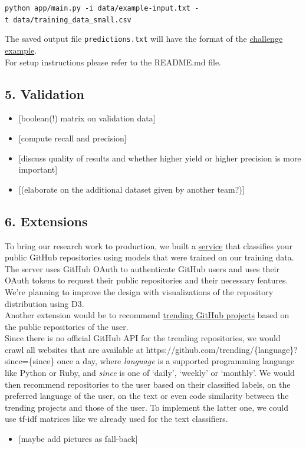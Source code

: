 \documentclass{article}
\providecommand{\tightlist}{%
  \setlength{\itemsep}{0pt}\setlength{\parskip}{0pt}}
\begin{document}
\texttt{python\ app/main.py\ -i\ data/example-input.txt\ -t\ data/training\_data\_small.csv}

The saved output file \texttt{predictions.txt} will have the format of
the
\href{https://github.com/InformatiCup/InformatiCup2017/blob/master/example-output}{challenge
example}.\\
For setup instructions please refer to the README.md file.

\subsection{5. Validation}\label{validation}

\begin{itemize}
\tightlist
\item
  {[}boolean(!) matrix on validation data{]}
\item
  {[}compute recall and precision{]}
\item
  {[}discuss quality of results and whether higher yield or higher
  precision is more important{]}
\item
  {[}(elaborate on the additional dataset given by another team?){]}
\end{itemize}

\subsection{6. Extensions}\label{extensions}

To bring our research work to production, we built a
\href{https://git-better.herokuapp.com/}{service} that classifies your
public GitHub repositories using models that were trained on our
training data. The server uses GitHub OAuth to authenticate GitHub users
and uses their OAuth tokens to request their public repositories and
their necessary features. We're planning to improve the design with
visualizations of the repository distribution using D3.\\
Another extension would be to recommend
\href{https://github.com/trending}{trending GitHub projects} based on
the public repositories of the user.\\
Since there is no official GitHub API for the trending repositories, we
would crawl all websites that are available at
https://github.com/trending/\{language\}?since=\{since\} once a day,
where \emph{language} is a supported programming language like Python or
Ruby, and \emph{since} is one of `daily', `weekly' or `monthly'. We
would then recommend repositories to the user based on their classified
labels, on the preferred language of the user, on the text or even code
similarity between the trending projects and those of the user. To
implement the latter one, we could use tf-idf matrices like we already
used for the text classifiers.

\begin{itemize}
\tightlist
\item
  {[}maybe add pictures as fall-back{]}
\end{itemize}
\end{document}

